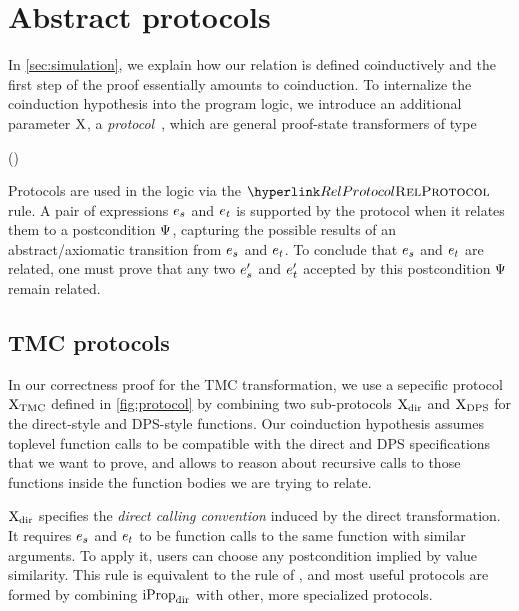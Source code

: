 \section{Abstract protocols} \label{sec:protocols} \label{subsec:protocols}



In \cref{sec:simulation}, we explain how our relation is defined coinductively and the first step of the proof essentially amounts to coinduction.
To internalize the coinduction hypothesis into the program logic, we introduce an additional parameter $\mathrm{X}$, a \emph{protocol}~\citep*{protocols-2021}, which are general proof-state transformers of type
\begin{mathline}
(\datalangExpr[] \to \datalangExpr[] \to \iProp) \to \datalangExpr[] \to \datalangExpr[] \to \iProp
\end{mathline}

Protocols are used in the logic via the $\RefTirName{RelProtocol}$ rule.
A pair of expressions $\datalangExpr_s$ and $\datalangExpr_t$ is supported by the protocol when it relates them to a postcondition $\Psi$, capturing the possible results of an abstract/axiomatic transition from $\datalangExpr_s$ and $\datalangExpr_t$.
To conclude that $\datalangExpr_s$ and $\datalangExpr_t$ are related, one must prove that any two $\datalangExpr_s'$ and $\datalangExpr_t'$ accepted by this postcondition $\Psi$ remain related.

\subsection{TMC protocols}

In our correctness proof for the TMC transformation, we use a sepecific protocol $\mathrm{X}_\mathrm{TMC}$ defined in \cref{fig:protocol} by combining two sub-protocols $\mathrm{X}_\mathrm{dir}$ and $\mathrm{X}_\mathrm{DPS}$ for the direct-style and DPS-style functions. Our coinduction hypothesis assumes toplevel function calls to be compatible with the direct and DPS specifications that we want to prove, and allows to reason about recursive calls to those functions inside the function bodies we are trying to relate.

$\mathrm{X}_\mathrm{dir}$ specifies the \emph{direct calling convention} induced by the direct transformation.
It requires $\datalangExpr_s$ and $\datalangExpr_t$ to be function calls to the same function with similar arguments.
To apply it, users can choose any postcondition implied by value similarity.
This rule is equivalent to the  rule of \Simuliris, and most useful protocols are formed by combining $\mathrm{iProp}_\mathrm{dir}$ with other, more specialized protocols.

